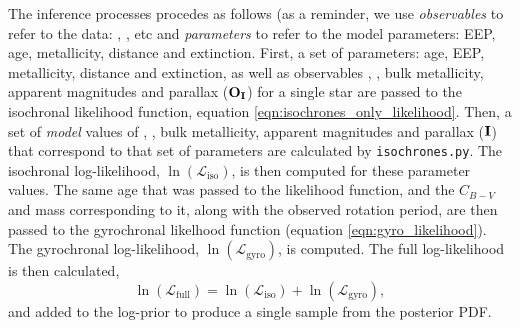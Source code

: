 The inference processes procedes as follows (as a reminder, we use {\it
observables} to refer to the data: \teff, \logg, etc and {\it parameters} to
refer to the model parameters: EEP, age, metallicity, distance and extinction.
First, a set of parameters: age, EEP, metallicity, distance and extinction, as
well as observables \teff, \logg, bulk metallicity, apparent magnitudes and
parallax (${\bf O_I}$) for a single star are passed to the isochronal
likelihood function, equation \eqref{eqn:isochrones_only_likelihood}.
Then, a set of {\it model} values of \teff, \logg, bulk metallicity, apparent
magnitudes and parallax (${\bf I}$) that correspond to that set of parameters
are calculated by {\tt isochrones.py}.
The isochronal log-likelihood, $\ln(\mathcal{L}_{\mathrm{iso}})$, is then
computed for these parameter values.
The same age that was passed to the likelihood function, and the $C_{B-V}$ and
mass corresponding to it, along with the observed rotation period, are then
passed to the gyrochronal likelhood function (equation
\ref{eqn:gyro_likelihood}).
The gyrochronal log-likelihood, $\ln(\mathcal{L}_{\mathrm{gyro}})$, is
computed.
The full log-likelihood is then calculated,
\begin{equation} \label{eqn:both_likelihood}
\ln(\mathcal{L}_{\mathrm{full}})
= \ln(\mathcal{L}_{\mathrm{iso}}) + \ln(\mathcal{L}_{\mathrm{gyro}}),
\end{equation}
and added to the log-prior to produce a single sample from the posterior PDF.

